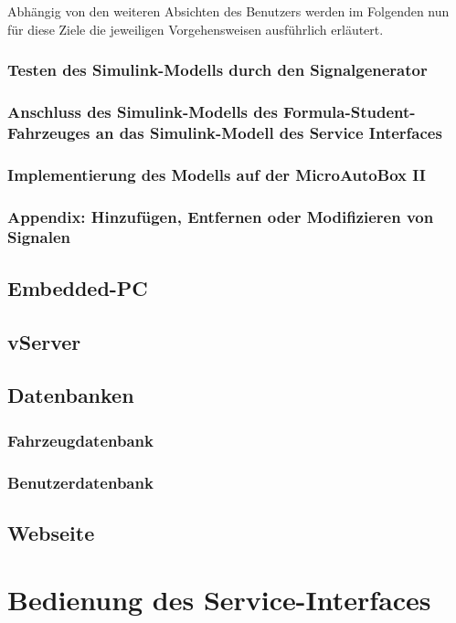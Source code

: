 \documentclass[fontsize = 12pt, paper = a4]{scrreprt}
\begin{document}

Abhängig von den weiteren Absichten des Benutzers werden im Folgenden nun für diese Ziele die jeweiligen Vorgehensweisen ausführlich erläutert. 

\subsection{Testen des Simulink-Modells durch den Signalgenerator}



\subsection{Anschluss des Simulink-Modells des Formula-Student-Fahrzeuges an das Simulink-Modell des Service Interfaces}


\subsection{Implementierung des Modells auf der MicroAutoBox II}


\subsection{Appendix: Hinzufügen, Entfernen oder Modifizieren von Signalen}





\section{Embedded-PC}

\section{vServer}

\section{Datenbanken}

\subsection{Fahrzeugdatenbank}

\subsection{Benutzerdatenbank}

\section{Webseite}


\chapter{Bedienung des Service-Interfaces}
\end{document}

